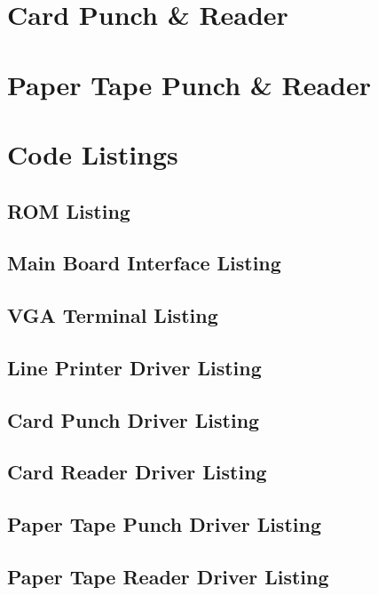 \documentclass{book}
\begin{document}
\chapter{Card Punch \& Reader}

\chapter{Paper Tape Punch \& Reader}

\appendix
\chapter{Code Listings}
\lstset{numbers=left, numberstyle=\tiny, stepnumber=1, numbersep=5pt}
\section{ROM Listing}
\cleardoublepage

\section{Main Board Interface Listing}
\cleardoublepage

\section{VGA Terminal Listing}
\cleardoublepage

\section{Line Printer Driver Listing}

\cleardoublepage

\section{Card Punch Driver Listing}
\cleardoublepage

\section{Card Reader Driver Listing}
\cleardoublepage

\section{Paper Tape Punch Driver Listing}
\cleardoublepage

\section{Paper Tape Reader Driver Listing}
\end{document}
